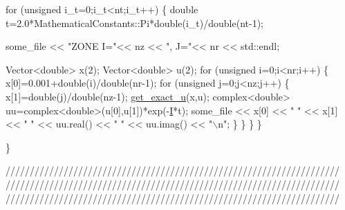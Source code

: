 \begin{DoxyCodeInclude}
  \textcolor{keywordflow}{for} (\textcolor{keywordtype}{unsigned} i\_t=0;i\_t<nt;i\_t++)
   \{
    \textcolor{keywordtype}{double} t=2.0*MathematicalConstants::Pi*double(i\_t)/double(nt-1);

    some\_file << \textcolor{stringliteral}{"ZONE I="}<< nz << \textcolor{stringliteral}{", J="}<< nr << std::endl;
    
    Vector<double> x(2);
    Vector<double> u(2);
    \textcolor{keywordflow}{for} (\textcolor{keywordtype}{unsigned} i=0;i<nr;i++)
     \{
      x[0]=0.001+double(i)/double(nr-1);
      \textcolor{keywordflow}{for} (\textcolor{keywordtype}{unsigned} j=0;j<nz;j++)
       \{
        x[1]=double(j)/double(nz-1);
        \hyperlink{namespacePlanarWave_a00f252bcf0181187c656a58ce36b07b5}{get\_exact\_u}(x,u); 
        complex<double> uu=complex<double>(u[0],u[1])*exp(-\hyperlink{namespacePlanarWave_a541691caf71477c8c389062797c0fdab}{I}*t);
        some\_file << x[0] << \textcolor{stringliteral}{" "} << x[1] << \textcolor{stringliteral}{" "} 
                  << uu.real() << \textcolor{stringliteral}{" "} << uu.imag() << \textcolor{stringliteral}{"\(\backslash\)n"};
       \}
     \} 
   \}
 \}
 
\}

\textcolor{comment}{}
\textcolor{comment}{/////////////////////////////////////////////////////////////////////}
\textcolor{comment}{/////////////////////////////////////////////////////////////////////}
\textcolor{comment}{/////////////////////////////////////////////////////////////////////}
\textcolor{comment}{}


\end{DoxyCodeInclude}
